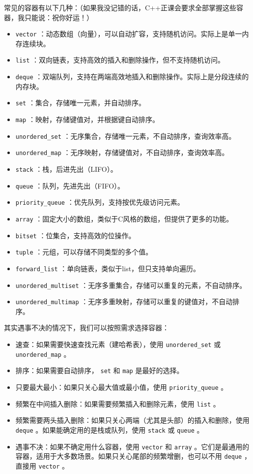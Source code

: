 常见的容器有以下几种：（如果我没记错的话，C++正课会要求全部掌握这些容器，我只能说：祝你好运！）
\begin{itemize}
  \item  \texttt{vector} ：动态数组（向量），可以自动扩容，支持随机访问。实际上是单一内存连续块。
  \item  \texttt{list} ：双向链表，支持高效的插入和删除操作，但不支持随机访问。
  \item  \texttt{deque} ：双端队列，支持在两端高效地插入和删除操作。实际上是分段连续的内存块。
  \item  \texttt{set} ：集合，存储唯一元素，并自动排序。
  \item  \texttt{map} ：映射，存储键值对，并根据键自动排序。
  \item  \texttt{unordered\_set} ：无序集合，存储唯一元素，不自动排序，查询效率高。
  \item  \texttt{unordered\_map} ：无序映射，存储键值对，不自动排序，查询效率高。
  \item  \texttt{stack} ：栈，后进先出（LIFO）。
  \item  \texttt{queue} ：队列，先进先出（FIFO）。
  \item  \texttt{priority\_queue} ：优先队列，支持按优先级访问元素。
  \item  \texttt{array} ：固定大小的数组，类似于C风格的数组，但提供了更多的功能。
  \item  \texttt{bitset} ：位集合，支持高效的位操作。
  \item  \texttt{tuple} ：元组，可以存储不同类型的多个值。
  \item  \texttt{forward\_list} ：单向链表，类似于list，但只支持单向遍历。
  \item  \texttt{unordered\_multiset} ：无序多重集合，存储可以重复的元素，不自动排序。
  \item  \texttt{unordered\_multimap} ：无序多重映射，存储可以重复的键值对，不自动排序。
\end{itemize}
其实遇事不决的情况下，我们可以按照需求选择容器：
\begin{itemize}
  \item 速查：如果需要快速查找元素（建哈希表），使用 \texttt{unordered\_set} 或 \texttt{unordered\_map} 。
  \item 排序：如果需要自动排序， \texttt{set} 和 \texttt{map} 是最好的选择。
  \item 只要最大最小：如果只关心最大值或最小值，使用 \texttt{priority\_queue} 。
  \item 频繁在中间插入删除：如果需要频繁插入和删除元素，使用 \texttt{list} 。
  \item 频繁需要两头插入删除：如果只关心两端（尤其是头部）的插入和删除，使用 \texttt{deque} 。如果能确定用的是栈或队列，使用 \texttt{stack} 或 \texttt{queue} 。
  \item 遇事不决：如果不确定用什么容器，使用 \texttt{vector} 和 \texttt{array} 。它们是最通用的容器，适用于大多数场景。如果只关心尾部的频繁增删，也可以不用 \texttt{deque} ，直接用 \texttt{vector} 。
\end{itemize}

